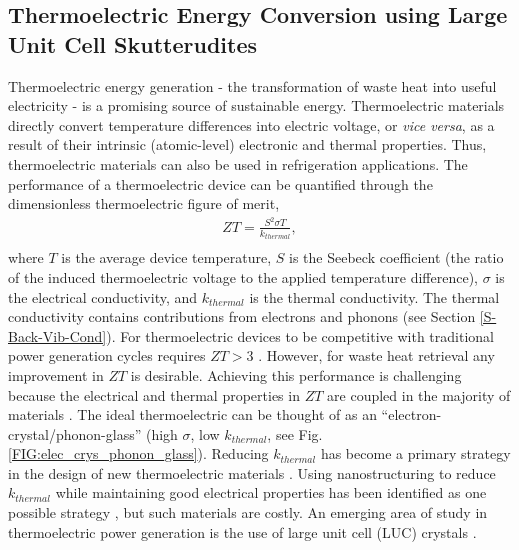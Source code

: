 \documentclass[letterpaper,12pt]{article}
\begin{document}
\subsection{\label{S-Motivation-Skutterudites}Thermoelectric Energy Conversion using Large Unit Cell Skutterudites}
Thermoelectric energy generation - the transformation of waste heat into useful electricity - is a promising source of sustainable energy.\cite{ADMA:ADMA200600527} Thermoelectric materials directly convert temperature differences into electric voltage, or \emph{vice versa}, as a result of their intrinsic (atomic-level) electronic and thermal properties. Thus, thermoelectric materials can also be used in refrigeration applications. The performance of a thermoelectric device can be quantified through the dimensionless thermoelectric figure of merit,
\begin{equation}\label{EQ:M:ZT}
\begin{split}
ZT = \frac{S^2\sigma T}{k_{thermal}}, \\
\end{split}
\end{equation}
where $T$ is the average device temperature, $S$ is the Seebeck coefficient (the ratio of the induced thermoelectric voltage to the applied temperature difference), $\sigma$ is the electrical conductivity, and $k_{thermal}$ is the thermal conductivity. The thermal conductivity contains contributions from electrons and phonons (see Section \ref{S-Back-Vib-Cond}). 
For thermoelectric devices to be competitive with traditional power generation cycles requires $ZT > 3$ \cite{Chen_Dresselhaus_Dresselhaus_Fleurial_Caillat_2003}. However, for waste heat retrieval any improvement in $ZT$ is desirable. Achieving this performance is challenging because the electrical and thermal properties in $ZT$ are coupled in the majority of materials \cite{ADMA:ADMA200600527,Chen_Dresselhaus_Dresselhaus_Fleurial_Caillat_2003}. The ideal thermoelectric can be thought of as an “electron-crystal/phonon-glass” (high $\sigma$, low $k_{thermal}$, see Fig. \ref{FIG:elec_crys_phonon_glass}). Reducing $k_{thermal}$ has become a primary strategy in the design of new thermoelectric materials \cite{ADMA:ADMA200600527}. Using nanostructuring to reduce $k_{thermal}$ while maintaining good electrical properties has been identified as one possible strategy \cite{B822664B}, but such materials are costly. An emerging area of study in thermoelectric power generation is the use of large unit cell (LUC) crystals \cite{nolas1999,ADMA:ADMA200600527}.
\end{document}
